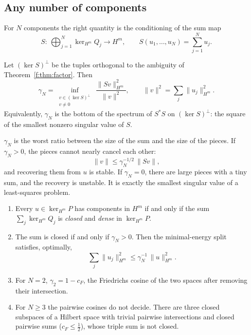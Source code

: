 \subsection{Any number of components}

For $N$ components the right quantity is the conditioning of the sum map
\[
S:\ \bigoplus_{j=1}^N\ker_{H^m}Q_j\to H^m,\qquad S(u_1,\dots,u_N)=\sum_{j=1}^Nu_j .
\]

\begin{definition}\label{def:gamma}
Let $(\ker S)^\perp$ be the tuples orthogonal to the ambiguity of Theorem~\ref{f:thm:factor}. Then
\[
\gamma_N=\inf_{\substack{v\in(\ker S)^\perp\\ v\ne0}}\ \frac{\|Sv\|_{H^m}^2}{\|v\|^2},
\qquad \|v\|^2=\sum_j\|u_j\|_{H^m}^2 .
\]
Equivalently, $\gamma_N$ is the bottom of the spectrum of $S^*S$ on $(\ker S)^\perp$: the square of the smallest nonzero singular value of $S$.
\end{definition}

\begin{intuition}
$\gamma_N$ is the worst ratio between the size of the sum and the size of the pieces. If $\gamma_N>0$, the pieces cannot nearly cancel each other:
\[
\|v\|\le\gamma_N^{-1/2}\,\|Sv\| ,
\]
and recovering them from $u$ is stable. If $\gamma_N=0$, there are large pieces with a tiny sum, and the recovery is unstable. It is exactly the smallest singular value of a least-squares problem.
\end{intuition}

\begin{theorem}\label{f:thm:hm}
\begin{enumerate}[label=(\alph*)]
\item Every $u\in\ker_{H^m}P$ has components in $H^m$ if and only if the sum $\sum_j\ker_{H^m}Q_j$ is \emph{closed} and \emph{dense} in $\ker_{H^m}P$.
\item The sum is closed if and only if $\gamma_N>0$. Then the minimal-energy split satisfies, optimally,
\[
\sum_j\|u_j\|_{H^m}^2\le\gamma_N^{-1}\,\|u\|_{H^m}^2 .
\]
\item For $N=2$, $\gamma_2=1-c_F$, the Friedrichs cosine of the two spaces after removing their intersection.
\item For $N\ge3$ the pairwise cosines do not decide. There are three closed subspaces of a Hilbert space with trivial pairwise intersections and closed pairwise sums ($c_F\le\tfrac12$), whose triple sum is not closed.
\end{enumerate}
\end{theorem}

